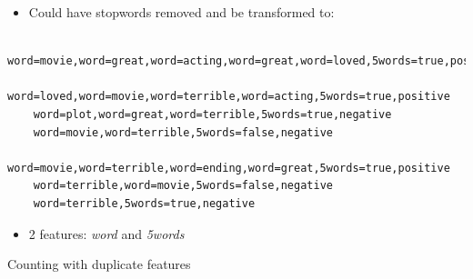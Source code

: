 \documentclass[11pt,letterpaper]{article}
\begin{document}
\begin{itemize}
  \item Could have stopwords removed and be transformed to:
\end{itemize}
    \begin{verbatim}
    word=movie,word=great,word=acting,word=great,word=loved,5words=true,positive
    word=loved,word=movie,word=terrible,word=acting,5words=true,positive
    word=plot,word=great,word=terrible,5words=true,negative
    word=movie,word=terrible,5words=false,negative
    word=movie,word=terrible,word=ending,word=great,5words=true,positive
    word=terrible,word=movie,5words=false,negative
    word=terrible,5words=true,negative\end{verbatim}

\begin{itemize}
  \item 2 features: \textit{word} and \textit{5words}
\end{itemize}

Counting with duplicate features
\end{document}
